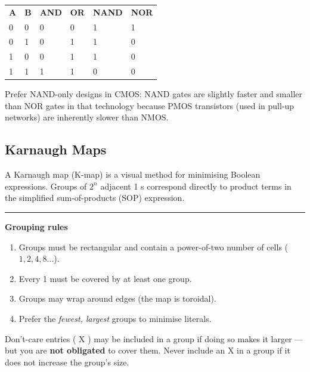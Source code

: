 \documentclass[12pt,a4paper]{article}
\newcommand{\ic}[1]{%
  \mbox{\colorbox{AnthCodeBG}{\footnotesize\ttfamily\textcolor{AnthBlue}{#1}}}%
}
\newcommand{\concept}[1]{%
  \noindent\textcolor{AnthGreen}{\rule{3pt}{10pt}}\enspace
  \textbf{\color{AnthDark}#1}\par\vspace{2pt}%
}
\newenvironment{Tip}[1][Tip]{%
  \begin{tcolorbox}[tipbox, title=#1]}{\end{tcolorbox}}
\newenvironment{Warn}[1][Warning]{%
  \begin{tcolorbox}[warnbox, title=#1]}{\end{tcolorbox}}
\begin{document}
\begin{center}
\begin{tabular}{C{0.8cm} C{0.8cm} C{1.1cm} C{1.1cm} C{1.1cm} C{1.1cm}}
  \color{white}\textbf{A} &
  \color{white}\textbf{B} &
  \color{white}\textbf{AND} &
  \color{white}\textbf{OR} &
  \color{white}\textbf{NAND} &
  \color{white}\textbf{NOR} \\
   0 & 0 & 0 & 0 & 1 & 1 \\
  0 & 1 & 0 & 1 & 1 & 0 \\
   1 & 0 & 0 & 1 & 1 & 0 \\
  1 & 1 & 1 & 1 & 0 & 0 \\
\end{tabular}
\end{center}

\begin{Tip}[Implementation tip]
  Prefer NAND-only designs in CMOS: NAND gates are slightly faster and smaller than
  NOR gates in that technology because PMOS transistors (used in pull-up networks) are
  inherently slower than NMOS.
\end{Tip}

\subsection{Karnaugh Maps}

A Karnaugh map (K-map) is a visual method for minimising Boolean expressions.
Groups of $2^n$ adjacent \ic{1}s correspond directly to product terms in the
simplified sum-of-products (SOP) expression.

\concept{Grouping rules}

\begin{enumerate}
  \item Groups must be rectangular and contain a power-of-two number of cells ($1, 2, 4, 8\ldots$).
  \item Every \ic{1} must be covered by at least one group.
  \item Groups may wrap around edges (the map is toroidal).
  \item Prefer the \emph{fewest, largest} groups to minimise literals.
\end{enumerate}

\begin{Warn}[Don't-care conditions]
  Don't-care entries (\ic{X}) may be included in a group if doing so makes it
  larger — but you are \textbf{not obligated} to cover them. Never include an
  \ic{X} in a group if it does not increase the group's size.
\end{Warn}
\end{document}
